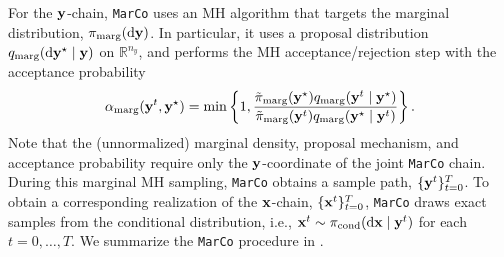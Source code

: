 \documentclass[onefignum,onetabnum]{siamonline250211}
\renewcommand{\d} {{\rm d}}                                %
\newcommand{\bfx}{{\bf x}}
\newcommand{\bfy}{{\bf y}}
\newcommand{\bbR}{\mathbb{R}}
\newcommand{\ny}{{n_{y}}}
\newcommand{\pcond}{\pi_{\rm cond}}
\newcommand{\pmarg}{\pi_{\rm marg}}
\newcommand{\MarCo}{\textnormal{\texttt{MarCo}}\xspace}
\begin{document}
%
For the $\bfy$-chain, \MarCo uses an MH algorithm that targets the marginal distribution, $\pmarg(\d\bfy)$. In particular, it uses a proposal distribution $q_{\rm marg}(\d\bfy^\star \mid \bfy)$ on $\bbR^\ny$, and performs the MH acceptance/rejection step with the acceptance probability
	\begin{align}\label{eq:marco_acceptance_probability}
	        \alpha_{\rm marg}(\bfy^t, \bfy^\star) = \min \left\{1, 
        \frac{
        \tilde{\pi}_{\rm marg}(\bfy^\star) q_{\rm marg}(\bfy^t \mid \bfy^\star)
        }{
        \tilde{\pi}_{\rm marg}(\bfy^t) q_{\rm marg}(\bfy^\star \mid \bfy^t)
        }
        \right\}.
	\end{align} 
Note that the (unnormalized) marginal density, proposal mechanism, and acceptance probability require only the $\bfy$-coordinate of the joint \MarCo chain. 
During this marginal MH sampling,  \MarCo obtains a sample path, $\{\bfy^t\}_{t=0}^T$. 
%
%
To obtain a corresponding realization of the $\bfx$-chain, $\{\bfx^t\}_{t=0}^T$, \MarCo  draws exact samples from the conditional distribution, i.e., $\bfx^t \sim \pcond(\d\bfx \mid \bfy^t)$ for each $t=0,\dots, T$. 
We summarize the \MarCo procedure in . 


%
%
%
%
%
%
%
%
%
%
%
%
%

%
%
%
%
\end{document}
